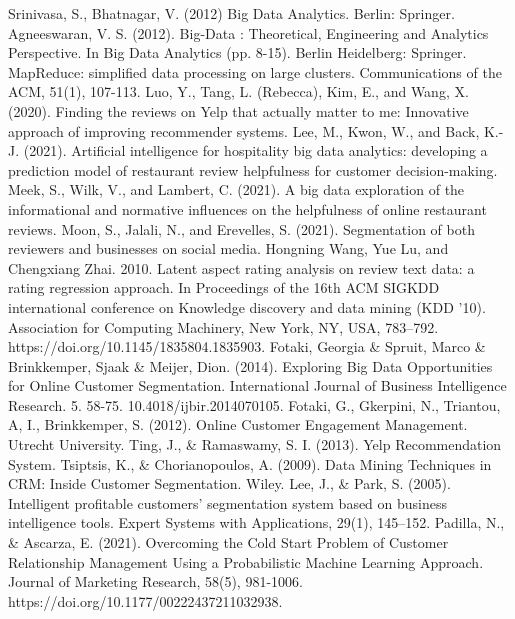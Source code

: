 \documentclass[conference]{IEEEtran}
\begin{document}
\begin{thebibliography}{00}
 Srinivasa, S., Bhatnagar, V. (2012) Big Data Analytics. Berlin: Springer.
 Agneeswaran, V. S. (2012). Big-Data : Theoretical, Engineering and Analytics Perspective. In Big Data Analytics (pp. 8-15). Berlin Heidelberg: Springer.
 MapReduce: simplified data processing on large
clusters. Communications of the ACM, 51(1), 107-113.
 Luo, Y., Tang, L. (Rebecca), Kim, E., and Wang, X. (2020). Finding the reviews on Yelp that actually matter to me: Innovative approach of improving recommender systems.
 Lee, M., Kwon, W., and Back, K.-J. (2021). Artificial intelligence for hospitality big data analytics: developing a prediction model of restaurant review helpfulness for customer decision-making.
 Meek, S., Wilk, V., and Lambert, C. (2021). A big data exploration of the informational and normative influences on the helpfulness of online restaurant reviews.
 Moon, S., Jalali, N., and Erevelles, S. (2021). Segmentation of both reviewers and businesses on social media.
 Hongning Wang, Yue Lu, and Chengxiang Zhai. 2010. Latent aspect rating analysis on review text data: a rating regression approach. In Proceedings of the 16th ACM SIGKDD international conference on Knowledge discovery and data mining (KDD '10). Association for Computing Machinery, New York, NY, USA, 783–792. https://doi.org/10.1145/1835804.1835903.
 Fotaki, Georgia \& Spruit, Marco \& Brinkkemper, Sjaak \& Meijer, Dion. (2014). Exploring Big Data Opportunities for Online Customer Segmentation. International Journal of Business Intelligence Research. 5. 58-75. 10.4018/ijbir.2014070105. 
 Fotaki, G., Gkerpini, N., Triantou, A, I., Brinkkemper, S. (2012). Online Customer Engagement Management. Utrecht University.
 Ting, J., \& Ramaswamy, S. I. (2013). Yelp Recommendation System.
 Tsiptsis, K., \& Chorianopoulos, A. (2009). Data Mining Techniques in CRM: Inside Customer
Segmentation. Wiley.
 Lee, J., \& Park, S. (2005). Intelligent profitable customers’ segmentation system based on business intelligence tools. Expert Systems with Applications, 29(1), 145–152.
 Padilla, N., \& Ascarza, E. (2021). Overcoming the Cold Start Problem of Customer Relationship Management Using  a Probabilistic Machine Learning Approach. Journal of Marketing Research, 58(5), 981-1006. https://doi.org/10.1177/00222437211032938.

\end{thebibliography}
\vspace{12pt}
\end{document}

